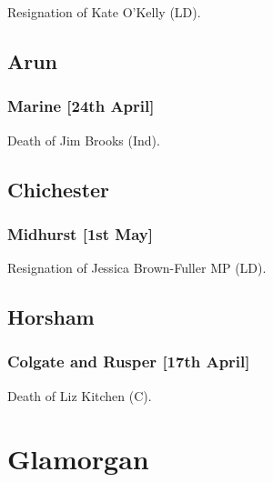 \documentclass[a4paper,openany]{book}
\begin{document}
\begin{resultsiii}
Resignation of Kate O'Kelly (LD).

\subsection*{Arun}

\subsubsection*{Marine \hspace*{\fill}\nolinebreak[1]%
	\enspace\hspace*{\fill}
	[24th April]}


Death of Jim Brooks (Ind).

\subsection*{Chichester}

\subsubsection*{Midhurst \hspace*{\fill}\nolinebreak[1]%
	\enspace\hspace*{\fill}
	[1st May]}


Resignation of Jessica Brown-Fuller MP (LD).

\subsection*{Horsham}

\subsubsection*{Colgate and Rusper \hspace*{\fill}\nolinebreak[1]%
	\enspace\hspace*{\fill}
	[17th April]}


Death of Liz Kitchen (C).

\section{Glamorgan}


\end{resultsiii}
\end{document}

